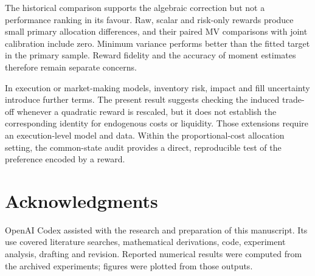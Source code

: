 \documentclass[sigconf,review]{acmart}
\begin{document}
The historical comparison supports the algebraic correction but not a performance ranking in its favour. Raw, scalar and risk-only rewards produce small primary allocation differences, and their paired MV comparisons with joint calibration include zero. Minimum variance performs better than the fitted target in the primary sample. Reward fidelity and the accuracy of moment estimates therefore remain separate concerns.

In execution or market-making models, inventory risk, impact and fill uncertainty introduce further terms. The present result suggests checking the induced trade-off whenever a quadratic reward is rescaled, but it does not establish the corresponding identity for endogenous costs or liquidity. Those extensions require an execution-level model and data. Within the proportional-cost allocation setting, the common-state audit provides a direct, reproducible test of the preference encoded by a reward.

\section*{Acknowledgments}
OpenAI Codex assisted with the research and preparation of this manuscript. Its use covered literature searches, mathematical derivations, code, experiment analysis, drafting and revision. Reported numerical results were computed from the archived experiments; figures were plotted from those outputs.

\clearpage


\end{document}
